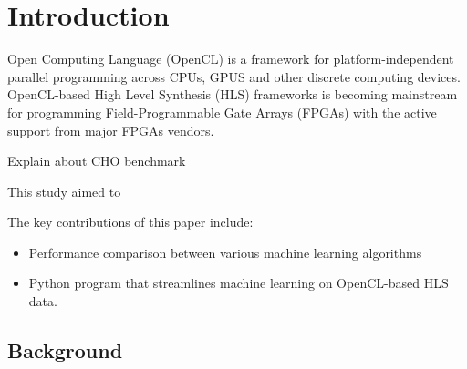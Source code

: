 \chapter{Introduction}
Open Computing Language (OpenCL) \citep{opencl} is a framework for platform-independent parallel programming across CPUs, GPUS and other discrete computing devices. OpenCL-based High Level Synthesis (HLS) frameworks is becoming mainstream for programming Field-Programmable Gate Arrays (FPGAs) with the active support from major FPGAs vendors. \citep{rich2015how}

Explain about CHO benchmark

This study aimed to 

The key contributions of this paper include:
\begin{itemize}
    \item Performance comparison between various machine learning algorithms
    \item Python program that streamlines machine learning on OpenCL-based HLS data.
\end{itemize}

\section{Background}
